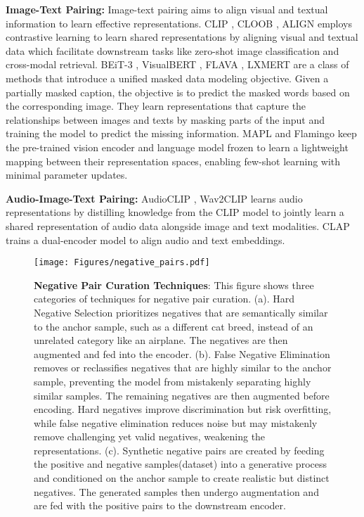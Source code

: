 \noindent
\textbf{Image-Text Pairing: }
Image-text pairing aims to align visual and textual information to learn effective representations. 
CLIP \cite{radford2021learning}, CLOOB \cite{furst2022cloob}, ALIGN \cite{jia2021scaling} employs contrastive learning to learn shared representations by aligning visual and textual data which facilitate downstream tasks like zero-shot image classification and cross-modal retrieval. BEiT-3 \cite{wang2022image}, VisualBERT \cite{li1908visualbert}, FLAVA \cite{singh2022flava}, LXMERT \cite{tan2019lxmert} are a class of methods that introduce a unified masked data modeling objective. Given a partially masked caption, the objective is to predict the masked words based on the corresponding image. They learn representations that capture the relationships between images and texts by masking parts of the input and training the model to predict the missing information. MAPL \cite{manas2022mapl} and Flamingo \cite{alayrac2022flamingo} keep the pre-trained vision encoder and language model frozen to learn a lightweight mapping between their representation spaces, enabling few-shot learning with minimal parameter updates.


\noindent
\textbf{Audio-Image-Text Pairing: }
AudioCLIP \cite{guzhov2022audioclip}, Wav2CLIP \cite{wu2022wav2clip} learns audio representations by distilling knowledge from the CLIP model to jointly learn a shared representation of audio data alongside image and text modalities. CLAP \cite{wu2023large} trains a dual-encoder model to align audio and text embeddings. %

\begin{figure*}[h!]
    \centering
    \texttt{[image: Figures/negative\_pairs.pdf]}
    \caption{\textbf{Negative Pair Curation Techniques}: 
    This figure shows three categories of techniques for negative pair curation. (a). Hard Negative Selection prioritizes negatives that are semantically similar to the anchor sample, such as a different cat breed, instead of an unrelated category like an airplane. The negatives are then augmented and fed into the encoder. (b). False Negative Elimination removes or reclassifies negatives that are highly similar to the anchor sample, preventing the model from mistakenly separating highly similar samples. The remaining negatives are then augmented before encoding. Hard negatives improve discrimination but risk overfitting, while false negative elimination reduces noise but may mistakenly remove challenging yet valid negatives, weakening the representations. (c). Synthetic negative pairs are created by feeding the positive and negative samples(dataset) into a generative process and conditioned on the anchor sample to create realistic but distinct negatives. The generated samples then undergo augmentation and are fed with the positive pairs to the downstream encoder.}
    \label{fig:negative}
\end{figure*}

